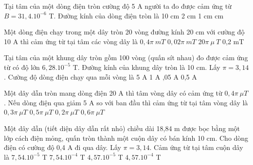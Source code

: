 \begin{vidu} %
Tại tâm của một dòng điện tròn cường độ 5 A người ta đo được cảm ứng từ $B = 31,4.10^{- 6}$ T. Đường kính của dòng điện tròn là
\choice
{10 cm}
{2 cm}
{1 cm}
{ cm}
\end{vidu}
\begin{vidu} %
Một dòng điện chạy trong một dây tròn 20 vòng đường kính 20 cm với cường độ 10 A thì cảm ứng từ tại tâm các vòng dây là
\choice
{\True $0,4\pi\ mT$}
{$0,02\pi\ mT$}
{$20\pi\ \mu\ T$}
{0,2 mT}
\end{vidu}

\begin{vidu} %
Tại tâm của một khung dây tròn gồm 100 vòng (quấn sít nhau) đo được cảm ứng từ có độ lớn $6,28.10^{-5}$ T. Đường kính của khung dây tròn là 10 cm. Lấy $\pi = 3,14$. Cường độ dòng điện chạy qua mỗi vòng là
\choice
{5 A}
{1 A}
{,05 A}
{0,5 A}
\end{vidu}
\begin{vidu} %
Một dây dẫn tròn mang dòng điện 20 A thì tâm vòng dây có cảm ứng từ $0,4\pi\ \mu T$. Nếu dòng điện qua giảm 5 A so với ban đầu thì cảm ứng từ tại tâm vòng dây là
\choice
{\True $0,3\pi \ \mu T$}
{$0,5\pi \ \mu T$}
{$0,2\pi \ \mu T$}
{$0,6\pi \ \mu T$}
\end{vidu}

\begin{vidu} %
Một dây dẫn (tiết diện dây dẫn rất nhỏ) chiều dài 18,84 m được bọc bằng một lớp cách điện mỏng, quấn tròn thành một cuộn dây có bán kính 10 cm. Cho dòng điện có cường độ 0,4 A đi qua dây. Lấy $\pi = 3,14$. Cảm ứng từ tại tâm cuộn dây là
\choice
{\True $7,54.10^{-5}$ T}
{$7,54.10^{-4}$ T}
{$4,57.10^{-5}$ T}
{$4,57.10^{-4}$ T}
\end{vidu}


